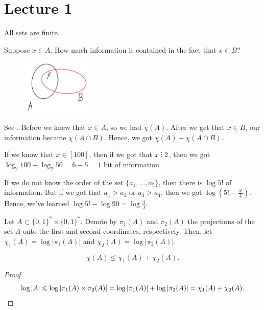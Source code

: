 
\section{Lecture 1} %

All sets are finite.

\begin{example}
    Suppose $x \in A$.
    How much information is contained in the fact that $x \in B$?
    \begin{figure}[H]
        \centering
        \includegraphics[width=0.3\textwidth]{figures/9268759F-085F-474A-94DD-01FC01C993CA}
        \caption{}
        \label{fig:4cd10f6d-3092-4fca-9f75-1e135943f348}
    \end{figure}

    See .
    Before we knew that $x \in A$, so we had  $\chi(A)$.
    After we get that $x \in B$, our information became $\chi(A \cap B)$.
    Hence, we got $\chi(A) - \chi(A \cap B)$.
\end{example}

\begin{example}
    If we know that $x \in [100]$, then if we got that $x \divby 2$, then we got  $\log_2 100 - \log_2 50 = 6 - 5 = 1$ bit of information.
\end{example}

\begin{example}
    If we do not know the order of the set $\{a_1, \ldots, a_5\}$, then there is $\log 5!$ of information.
    But if we got that $a_1 > a_2$ or $a_3 > a_4$, then we got $\log (5! - \frac{5!}{4})$.
    Hence, we've learned $\log 5! - \log 90 = \log \frac{4}{3}$.
\end{example}

\begin{definition}
    Let $A \subset \{0, 1\}^* \times \{0, 1\}^*$.
    Denote by $\pi_1(A)$ and $\pi_2(A)$ the projections of the set $A$ onto the first and second coordinates, respectively.
    Then, let $\chi_1(A) = \log |\pi_1(A)|$ and $\chi_2(A) = \log |\pi_2(A)|$.
\end{definition}
\begin{theorem}
    \[\chi(A) \leq \chi_1(A) + \chi_2(A).\]
\end{theorem}
\begin{proof}
    \[
        \log |A| \leq \log |\pi_1(A) \times \pi_2(A)| = \log |\pi_1(A)| + \log |\pi_2(A)| = \chi_1(A) + \chi_2(A). \qedhere
    \]
\end{proof}

